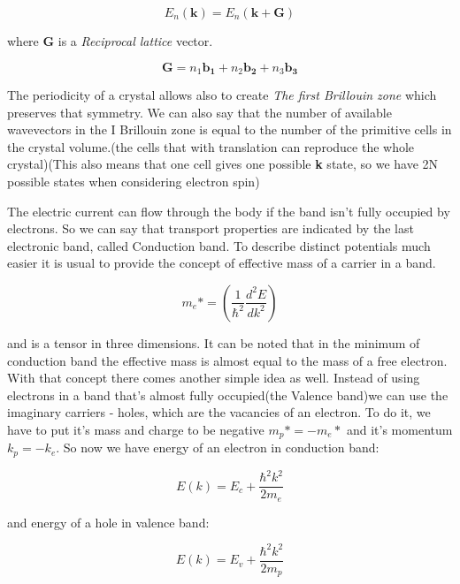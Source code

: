\begin{equation}
E_n(\mathbf{k})=E_n(\mathbf{k}+\mathbf{G})
\end{equation}

where \textbf{G} is a \textit{Reciprocal lattice} vector. 

\begin{equation}
\mathbf{G} = n_1\mathbf{b_1} + n_2\mathbf{b_2}+ n_3\mathbf{b_3}
\end{equation}

The periodicity of a crystal allows also to create \textit{The first Brillouin zone} which preserves that symmetry. We can also say that the number of available wavevectors in the I Brillouin zone is equal to the number of the primitive cells in the crystal volume.(the cells that with translation can reproduce the whole crystal)(This also means that one cell gives one possible \textbf{k} state, so we have 2N possible states when considering electron spin)

The electric current can flow through the body if the band isn't fully occupied by electrons. So we can say  that transport properties are indicated by the last electronic band, called Conduction band. To describe distinct potentials much easier it is usual to provide the concept of effective mass of a carrier in a band. 

\begin{equation}
m_e* = \left( \frac{1}{\hbar ^2}\frac{d^2 E}{dk^2}\right)
\end{equation}

and is a tensor in three dimensions. It can be noted that in the minimum of conduction band the effective mass is almost equal to the mass of a free electron. With that concept there comes another simple idea as well. Instead of using electrons in a band that's almost fully occupied(the Valence band)we can use the imaginary carriers - holes, which are the vacancies of an electron. To do it, we have to put it's mass and charge to be negative $ m_p * = -m_e * $ and it's momentum $k_p = - k_e$. So now we have energy of an electron in conduction band:

\begin{equation}
E(k) = E_c + \frac{\hbar ^2 k^2}{2m_e}
\end{equation}

and energy of a hole in valence band:

\begin{equation}
E(k) = E_v + \frac{\hbar ^2 k^2}{2m_p}
\end{equation}

